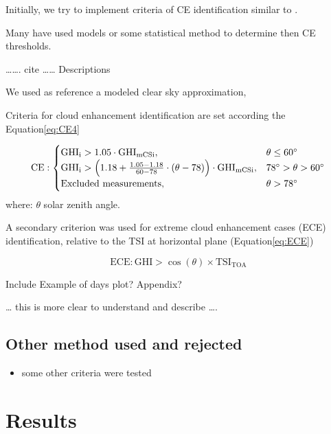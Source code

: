 \documentclass[
]{article}
\providecommand{\tightlist}{%
  \setlength{\itemsep}{0pt}\setlength{\parskip}{0pt}}
\begin{document}
Initially, we try to implement criteria of CE identification similar to .

Many have used models or some statistical method to determine then CE thresholds.

\ldots\ldots. cite \ldots\ldots{} Descriptions

We used as reference a modeled clear sky approximation,

Criteria for cloud enhancement identification are set according the Equation\nobreakspace\ref{eq:CE4}

\begin{equation}
\text{CE} : \begin{cases}
 \text{GHI}_\text{i} > 1.05 \cdot \text{GHI}_\text{mCSi}, & \text{$\theta \leq 60^\circ$}\\
\text{GHI}_\text{i} > \left ({ 1.18 + \frac{1.05 - 1.18}{60 - 78} \cdot (\theta- 78) } \right ) \cdot \text{GHI}_\text{mCSi}, & \text{$ 78^\circ > \theta > 60^\circ$}\\
\text{Excluded measurements}, & \theta > 78^\circ
\end{cases}\label{eq:CE4b}
\end{equation}
where: \(\theta\) solar zenith angle.

A secondary criterion was used for extreme cloud enhancement cases (ECE)
identification, relative to the TSI at horizontal plane
(Equation\nobreakspace{}\ref{eq:ECE})

\begin{equation}
\text{ECE}: \text{GHI} > \cos(\theta) \times \text{TSI}_\text{TOA}
\label{eq:ECE}
\end{equation}

Include Example of days plot? Appendix?

\ldots{} this is more clear to understand and describe \ldots.

\hypertarget{other-method-used-and-rejected}{%
\subsection{Other method used and rejected}\label{other-method-used-and-rejected}}

\begin{itemize}
\tightlist
\item
  some other criteria were tested
\end{itemize}

\FloatBarrier

\hypertarget{results}{%
\section{Results}\label{results}}
\end{document}
